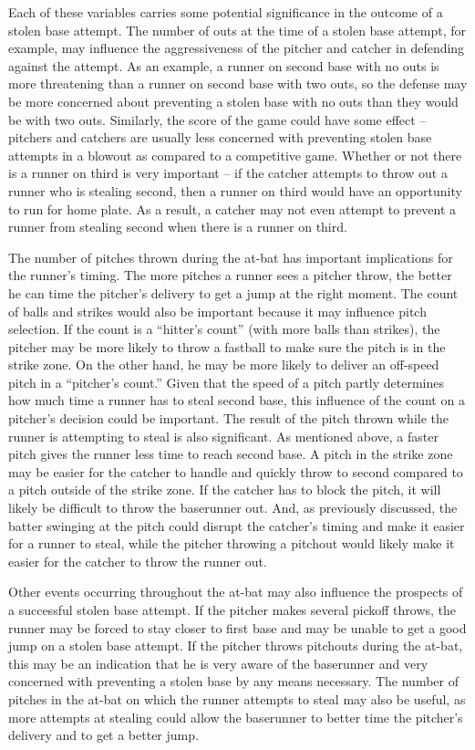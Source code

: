 \documentclass{article}
\begin{document}
Each of these variables carries some potential significance in the outcome of a stolen base attempt. The number of outs at the time of a stolen base attempt, for example, may influence the aggressiveness of the pitcher and catcher in defending against the attempt. As an example, a runner on second base with no outs is more threatening than a runner on second base with two outs, so the defense may be more concerned about preventing a stolen base with no outs than they would be with two outs. Similarly, the score of the game could have some effect – pitchers and catchers are usually less concerned with preventing stolen base attempts in a blowout as compared to a competitive game. Whether or not there is a runner on third is very important – if the catcher attempts to throw out a runner who is stealing second, then a runner on third would have an opportunity to run for home plate. As a result, a catcher may not even attempt to prevent a runner from stealing second when there is a runner on third.

The number of pitches thrown during the at-bat has important implications for the runner’s timing. The more pitches a runner sees a pitcher throw, the better he can time the pitcher’s delivery to get a jump at the right moment. The count of balls and strikes would also be important because it may influence pitch selection. If the count is a “hitter’s count” (with more balls than strikes), the pitcher may be more likely to throw a fastball to make sure the pitch is in the strike zone. On the other hand, he may be more likely to deliver an off-speed pitch in a “pitcher’s count.” Given that the speed of a pitch partly determines how much time a runner has to steal second base, this influence of the count on a pitcher’s decision could be important. The result of the pitch thrown while the runner is attempting to steal is also significant. As mentioned above, a faster pitch gives the runner less time to reach second base. A pitch in the strike zone may be easier for the catcher to handle and quickly throw to second compared to a pitch outside of the strike zone. If the catcher has to block the pitch, it will likely be difficult to throw the baserunner out. And, as previously discussed, the batter swinging at the pitch could disrupt the catcher’s timing and make it easier for a runner to steal, while the pitcher throwing a pitchout would likely make it easier for the catcher to throw the runner out.

Other events occurring throughout the at-bat may also influence the prospects of a successful stolen base attempt. If the pitcher makes several pickoff throws, the runner may be forced to stay closer to first base and may be unable to get a good jump on a stolen base attempt. If the pitcher throws pitchouts during the at-bat, this may be an indication that he is very aware of the baserunner and very concerned with preventing a stolen base by any means necessary. The number of pitches in the at-bat on which the runner attempts to steal may also be useful, as more attempts at stealing could allow the baserunner to better time the pitcher’s delivery and to get a better jump.
\end{document}
